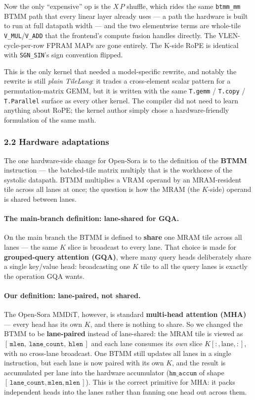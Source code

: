 \documentclass[
  10pt,
]{article}
\begin{document}
Now the only ``expensive'' op is the \(X\,P\) shuffle, which rides the
same \texttt{btmm\_mm} BTMM path that every linear layer already uses ---
a path the hardware is built to run at full datapath width --- and the
two elementwise terms are whole-tile \texttt{V\_MUL}/\texttt{V\_ADD} that
the frontend's compute fusion handles directly. The
VLEN-cycle-per-row FPRAM MAPs are gone entirely. The K-side RoPE is
identical with \texttt{SGN\_SIN}'s sign convention flipped.

This is the only kernel that needed a model-specific rewrite, and notably
the rewrite is still \emph{plain TileLang}: it trades a cross-element
scalar pattern for a permutation-matrix GEMM, but it is written with the
same \texttt{T.gemm} / \texttt{T.copy} / \texttt{T.Parallel} surface as
every other kernel. The compiler did not need to learn anything about
RoPE; the kernel author simply chose a hardware-friendly formulation of
the same math.

\subsubsection{2.2 Hardware adaptations}\label{adapt-hardware}

The one hardware-side change for Open-Sora is to the definition of the
\textbf{BTMM} instruction --- the batched-tile matrix multiply that is
the workhorse of the systolic datapath. BTMM multiplies a VRAM operand by
an MRAM-resident tile across all lanes at once; the question is how the
MRAM (the \(K\)-side) operand is shared between lanes.

\paragraph{The main-branch definition: lane-shared for GQA.} On the main
branch the BTMM is defined to \textbf{share} one MRAM tile across all
lanes --- the same \(K\) slice is broadcast to every lane. That choice is
made for \textbf{grouped-query attention (GQA)}, where many query heads
deliberately share a single key/value head: broadcasting one \(K\) tile
to all the query lanes is exactly the operation GQA wants.

\paragraph{Our definition: lane-paired, not shared.} The Open-Sora MMDiT,
however, is standard \textbf{multi-head attention (MHA)} --- every head
has its own \(K\), and there is nothing to share. So we changed the BTMM
to be \textbf{lane-paired} instead of lane-shared: the MRAM tile is viewed
as \([\,\mathtt{mlen},\ \mathtt{lane\_count},\ \mathtt{hlen}\,]\) and each
lane consumes its \emph{own} slice \(K[:, \text{lane}, :]\), with no
cross-lane broadcast. One BTMM still updates all lanes in a single
instruction, but each lane is now paired with its own \(K\), and the
result is accumulated per lane into the hardware accumulator
(\(\mathtt{hm\_accum}\) of shape
\([\,\mathtt{lane\_count}, \mathtt{mlen}, \mathtt{mlen}\,]\)). This is the
correct primitive for MHA: it packs independent heads into the lanes
rather than fanning one head out across them.
\end{document}
